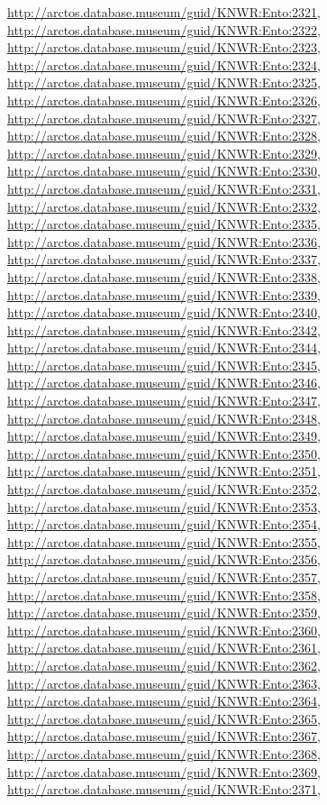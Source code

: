 \documentclass[9pt, article]{memoir}
\begin{document}
\begin{multicols}{2}
\url{http://arctos.database.museum/guid/KNWR:Ento:2321}, 
\url{http://arctos.database.museum/guid/KNWR:Ento:2322}, 
\url{http://arctos.database.museum/guid/KNWR:Ento:2323}, 
\url{http://arctos.database.museum/guid/KNWR:Ento:2324}, 
\url{http://arctos.database.museum/guid/KNWR:Ento:2325}, 
\url{http://arctos.database.museum/guid/KNWR:Ento:2326}, 
\url{http://arctos.database.museum/guid/KNWR:Ento:2327}, 
\url{http://arctos.database.museum/guid/KNWR:Ento:2328}, 
\url{http://arctos.database.museum/guid/KNWR:Ento:2329}, 
\url{http://arctos.database.museum/guid/KNWR:Ento:2330}, 
\url{http://arctos.database.museum/guid/KNWR:Ento:2331}, 
\url{http://arctos.database.museum/guid/KNWR:Ento:2332}, 
\url{http://arctos.database.museum/guid/KNWR:Ento:2335}, 
\url{http://arctos.database.museum/guid/KNWR:Ento:2336}, 
\url{http://arctos.database.museum/guid/KNWR:Ento:2337}, 
\url{http://arctos.database.museum/guid/KNWR:Ento:2338}, 
\url{http://arctos.database.museum/guid/KNWR:Ento:2339}, 
\url{http://arctos.database.museum/guid/KNWR:Ento:2340}, 
\url{http://arctos.database.museum/guid/KNWR:Ento:2342}, 
\url{http://arctos.database.museum/guid/KNWR:Ento:2344}, 
\url{http://arctos.database.museum/guid/KNWR:Ento:2345}, 
\url{http://arctos.database.museum/guid/KNWR:Ento:2346}, 
\url{http://arctos.database.museum/guid/KNWR:Ento:2347}, 
\url{http://arctos.database.museum/guid/KNWR:Ento:2348}, 
\url{http://arctos.database.museum/guid/KNWR:Ento:2349}, 
\url{http://arctos.database.museum/guid/KNWR:Ento:2350}, 
\url{http://arctos.database.museum/guid/KNWR:Ento:2351}, 
\url{http://arctos.database.museum/guid/KNWR:Ento:2352}, 
\url{http://arctos.database.museum/guid/KNWR:Ento:2353}, 
\url{http://arctos.database.museum/guid/KNWR:Ento:2354}, 
\url{http://arctos.database.museum/guid/KNWR:Ento:2355}, 
\url{http://arctos.database.museum/guid/KNWR:Ento:2356}, 
\url{http://arctos.database.museum/guid/KNWR:Ento:2357}, 
\url{http://arctos.database.museum/guid/KNWR:Ento:2358}, 
\url{http://arctos.database.museum/guid/KNWR:Ento:2359}, 
\url{http://arctos.database.museum/guid/KNWR:Ento:2360}, 
\url{http://arctos.database.museum/guid/KNWR:Ento:2361}, 
\url{http://arctos.database.museum/guid/KNWR:Ento:2362}, 
\url{http://arctos.database.museum/guid/KNWR:Ento:2363}, 
\url{http://arctos.database.museum/guid/KNWR:Ento:2364}, 
\url{http://arctos.database.museum/guid/KNWR:Ento:2365}, 
\url{http://arctos.database.museum/guid/KNWR:Ento:2367}, 
\url{http://arctos.database.museum/guid/KNWR:Ento:2368}, 
\url{http://arctos.database.museum/guid/KNWR:Ento:2369}, 
\url{http://arctos.database.museum/guid/KNWR:Ento:2371}, 

\end{multicols}
\end{document}
